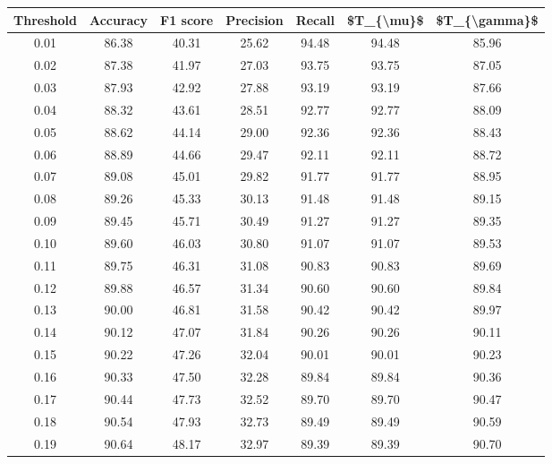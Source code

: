 \begin{tabular}{|c|c|c|c|c|c|c|}
\hline
 Threshold &  Accuracy &  F1 score &  Precision &  Recall &  \$T\_\{\textbackslash mu\}\$ &  \$T\_\{\textbackslash gamma\}\$ \\
\hline
      0.01 &     86.38 &     40.31 &      25.62 &   94.48 &      94.48 &         85.96 \\
      0.02 &     87.38 &     41.97 &      27.03 &   93.75 &      93.75 &         87.05 \\
      0.03 &     87.93 &     42.92 &      27.88 &   93.19 &      93.19 &         87.66 \\
      0.04 &     88.32 &     43.61 &      28.51 &   92.77 &      92.77 &         88.09 \\
      0.05 &     88.62 &     44.14 &      29.00 &   92.36 &      92.36 &         88.43 \\
      0.06 &     88.89 &     44.66 &      29.47 &   92.11 &      92.11 &         88.72 \\
      0.07 &     89.08 &     45.01 &      29.82 &   91.77 &      91.77 &         88.95 \\
      0.08 &     89.26 &     45.33 &      30.13 &   91.48 &      91.48 &         89.15 \\
      0.09 &     89.45 &     45.71 &      30.49 &   91.27 &      91.27 &         89.35 \\
      0.10 &     89.60 &     46.03 &      30.80 &   91.07 &      91.07 &         89.53 \\
      0.11 &     89.75 &     46.31 &      31.08 &   90.83 &      90.83 &         89.69 \\
      0.12 &     89.88 &     46.57 &      31.34 &   90.60 &      90.60 &         89.84 \\
      0.13 &     90.00 &     46.81 &      31.58 &   90.42 &      90.42 &         89.97 \\
      0.14 &     90.12 &     47.07 &      31.84 &   90.26 &      90.26 &         90.11 \\
      0.15 &     90.22 &     47.26 &      32.04 &   90.01 &      90.01 &         90.23 \\
      0.16 &     90.33 &     47.50 &      32.28 &   89.84 &      89.84 &         90.36 \\
      0.17 &     90.44 &     47.73 &      32.52 &   89.70 &      89.70 &         90.47 \\
      0.18 &     90.54 &     47.93 &      32.73 &   89.49 &      89.49 &         90.59 \\
      0.19 &     90.64 &     48.17 &      32.97 &   89.39 &      89.39 &         90.70 \\

\end{tabular}
